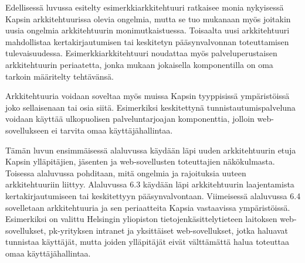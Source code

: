 Edellisessä luvussa esitelty esimerkkiarkkitehtuuri ratkaisee monia nykyisessä Kapsin arkkitehtuurissa olevia ongelmia, mutta se tuo mukanaan myös joitakin uusia ongelmia arkkitehtuurin monimutkaistuessa. Toisaalta uusi arkkitehtuuri mahdollistaa kertakirjautumisen tai keskitetyn pääsynvalvonnan toteuttamisen tulevaisuudessa. Esimerkkiarkkitehtuuri noudattaa myös palveluperustaisen arkkitehtuurin periaatetta, jonka mukaan jokaisella komponentilla on oma tarkoin määritelty tehtävänsä.

Arkkitehtuuria voidaan soveltaa myös muissa Kapsin tyyppisissä ympäristöissä joko sellaisenaan tai osia siitä. Esimerkiksi keskitettynä tunnistautumispalveluna voidaan käyttää ulkopuolisen palveluntarjoajan komponenttia, jolloin web-sovellukseen ei tarvita omaa käyttäjähallintaa.

Tämän luvun ensimmäisessä alaluvussa käydään läpi uuden arkkitehtuurin etuja Kapsin ylläpitäjien, jäsenten ja web-sovellusten toteuttajien näkökulmasta. Toisessa alaluvussa pohditaan, mitä ongelmia ja rajoituksia uuteen arkkitehtuuriin liittyy. Alaluvussa 6.3 käydään läpi arkkitehtuurin laajentamista kertakirjautumiseen tai keskitettyyn pääsynvalvontaan. Viimeisessä alaluvussa 6.4 sovelletaan arkkitehtuuria ja sen periaatteita Kapsia vastaavissa ympäristöissä. Esimerkiksi on valittu Helsingin yliopiston tietojenkäsittelytieteen laitoksen web-sovellukset, pk-yrityksen intranet ja yksittäiset web-sovellukset, jotka haluavat tunnistaa käyttäjät, mutta joiden ylläpitäjät eivät välttämättä halua toteuttaa omaa käyttäjähallintaa.